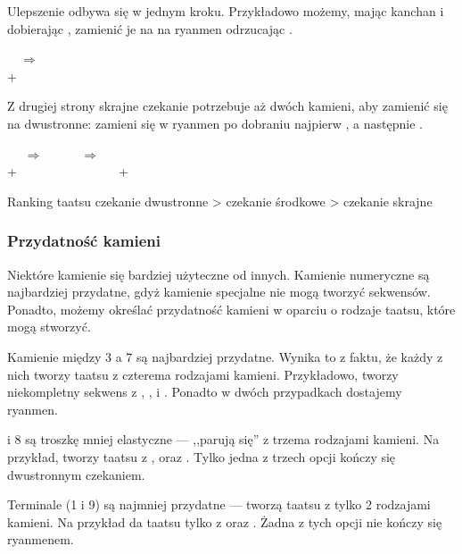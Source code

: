 \bigskip
Ulepszenie odbywa się w jednym kroku.
Przykładowo możemy, mając {\jap kanchan}  i dobierając , zamienić je na na {\jap ryanmen}  odrzucając .
\begin{center}
{ ~~$\Rightarrow$~~ }\\
+ 
\end{center}
Z drugiej strony skrajne czekanie potrzebuje aż dwóch kamieni, aby zamienić się na dwustronne:  zamieni się w {\jap ryanmen} po dobraniu najpierw , a następnie .
\begin{center}
{ ~~ $\Rightarrow$ ~~  ~~ $\Rightarrow$ ~~ }\\
+  ~~~~~~~~~~~~~~~ + 
\end{center}

\bigskip

\color{MyRed}
\begin{itembox}[c]{Ranking {\jap taatsu}}
\normalcolor
\centering
czekanie dwustronne > czekanie środkowe > czekanie skrajne
\end{itembox}
\normalcolor

\bigskip

\subsubsection{Przydatność kamieni} \label{sec:versatility}

Niektóre kamienie się bardziej użyteczne od innych.
Kamienie numeryczne są najbardziej przydatne, gdyż kamienie specjalne nie mogą tworzyć sekwensów.
Ponadto, możemy określać przydatność kamieni w oparciu o rodzaje {\jap taatsu}, które mogą stworzyć.

\bigskip
Kamienie między 3 a 7 są najbardziej przydatne.
Wynika to z faktu, że każdy z nich tworzy {\jap taatsu} z czterema rodzajami kamieni.
Przykładowo,  tworzy niekompletny sekwens z , ,  i .
Ponadto w dwóch przypadkach dostajemy {\jap ryanmen}.

 i 8 są troszkę mniej elastyczne --- ,,parują się'' z trzema rodzajami kamieni.
Na przykład,  tworzy {\jap taatsu} z ,  oraz .
Tylko jedna z trzech opcji kończy się dwustronnym czekaniem.

\bigskip
Terminale (1 i 9) są najmniej przydatne --- tworzą {\jap taatsu} z tylko 2 rodzajami kamieni. Na przykład  da {\jap taatsu} tylko z  oraz .
Żadna z tych opcji nie kończy się {\jap ryanmen}em.

